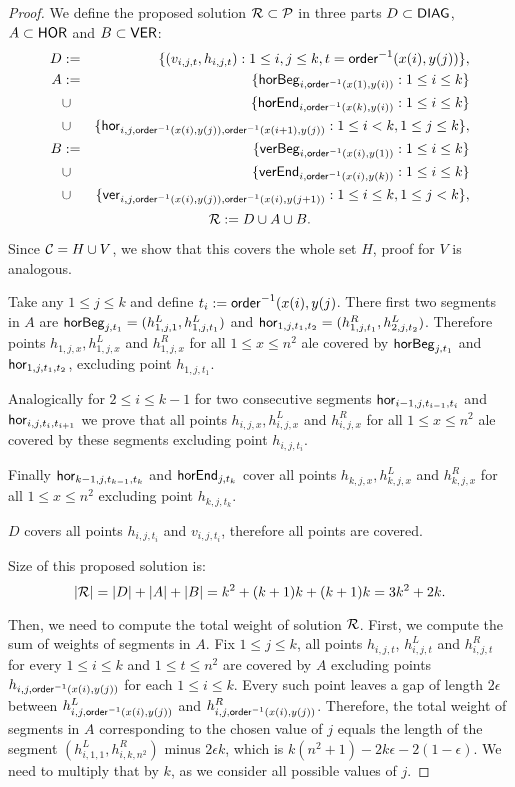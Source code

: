 {{{{\begin{proof}
We define the proposed solution $\mathcal{R} \subset \mathcal{P}$
in three parts $D \subset \mathsf{DIAG}$, $A \subset \mathsf{HOR}$ and $B \subset \mathsf{VER}$:
\begin{eqnarray*}
	D & := & \{(v_{i, j, t}, h_{i, j, t}) : 1 \le i, j \le k, t = \mathsf{order}^{-1}(x(i), y(j))\}, \\
	A & := & \{\mathsf{horBeg}_{i,\mathsf{order}^{-1}(x(1), y(i))} : 1 \le i \le k\} \\
	& \cup & \{\mathsf{horEnd}_{i,\mathsf{order}^{-1}(x(k), y(i))} : 1 \le i \le k\} \\
	& \cup & \{\mathsf{hor}_{i,j,\mathsf{order}^{-1}(x(i), y(j)),\mathsf{order}^{-1}(x(i+1), y(j))} : 1 \le i < k, 1 \le j \le k\}, \\
	B & := & \{\mathsf{verBeg}_{i,\mathsf{order}^{-1}(x(i), y(1))} : 1 \le i \le k\} \\
	& \cup & \{\mathsf{verEnd}_{i,\mathsf{order}^{-1}(x(i), y(k))} : 1 \le i \le k\} \\
	& \cup & \{\mathsf{ver}_{i,j,\mathsf{order}^{-1}(x(i), y(j)),\mathsf{order}^{-1}(x(i), y(j+1))} : 1 \le i \le k, 1 \le j < k\},
\end{eqnarray*}
	$$\mathcal{R} := D \cup A \cup B.$$

Since $\mathcal{C} = H \cup V$, we show that this covers the whole set $H$,
proof for $V$ is analogous.

Take any $1 \le j \le k$ and define $t_{i} := \mathsf{order}^{-1}(x(i), y(j)$.
There first two segments in $A$ are
$\mathsf{horBeg}_{j,t_1} = (h_{1,j,1}^L, h_{1, j, t_1}^L)$ and
$\mathsf{hor}_{1,j,t_1,t_2} = (h_{1,j, t_1}^R, h_{2,j,t_2}^L)$.
Therefore points $h_{1,j,x}, h_{1,j,x}^L$ and $h_{1,j,x}^R$
for all $1 \le x \le n^2$ ale covered by $\mathsf{horBeg}_{j,t_1}$ and $\mathsf{hor}_{1,j,t_1,t_2}$,
excluding point $h_{1,j,t_1}$.

Analogically for $2 \le i \le k-1$
for two consecutive segments $\mathsf{hor}_{i-1,j,t_{i-1},t_i}$
and $\mathsf{hor}_{i,j,t_i,t_{i+1}}$ we prove that 
all points $h_{i,j,x}, h_{i,j,x}^L$ and $h_{i,j,x}^R$
for all $1 \le x \le n^2$ ale covered by these segments
excluding point $h_{i,j,t_i}$.

Finally $\mathsf{hor}_{k-1,j,t_{k-1},t_k}$ and $\mathsf{horEnd}_{j,t_k}$
cover all points $h_{k,j,x}, h_{k,j,x}^L$ and $h_{k,j,x}^R$
for all $1 \le x \le n^2$ excluding point $h_{k,j,t_k}$.

$D$ covers all points $h_{i,j, t_i}$ and $v_{i,j, t_i}$, therefore
all points are covered.

Size of this proposed solution is:
$$|\mathcal{R}| = |D| + |A| + |B| = k^2 + (k+1)k + (k+1)k = 3k^2+2k.$$

Then, we need to compute the total weight of solution $\mathcal{R}$.
First, we compute the sum of weights of segments in $A$.
Fix $1 \le j \le k$, all points $h_{i,j,t}$, $h_{i,j,t}^L$ and $h_{i,j,t}^R$
for every $1 \le i \le k$ and $1 \le t \le n^2$ are covered by $A$
excluding points $h_{i,j,\mathsf{order}^{-1}(x(i),y(j))}$ for each $1 \le i \le k$.
Every such point leaves a gap of length $2\epsilon$ between
$h_{i,j,\mathsf{order}^{-1}(x(i),y(j))}^L$ and $h_{i,j,\mathsf{order}^{-1}(x(i),y(j))}^R$.
Therefore, the total weight of segments in $A$
corresponding to the chosen value of $j$ equals the length of the segment
$(h_{i,1,1}^L, h_{i,k,n^2}^R)$
minus $2\epsilon k$, which is $k(n^2+1) -2k\epsilon -2(1-\epsilon)$.
We need to multiply that by $k$, as we consider all possible values of $j$.


\end{proof}}}}}

